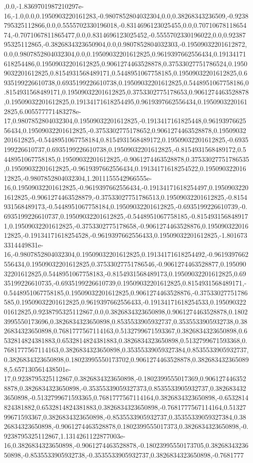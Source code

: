 ,0.0,-1.8369701987210297e-16,-1.0,0.0,0.1950903220161283,-0.9807852804032304,0.0,0.38268343236509,-0.9238795325112866,0.0,0.5555702330196018,-0.8314696123025455,0.0,0.7071067811865474,-0.7071067811865477,0.0,0.8314696123025452,-0.5555702330196022,0.0,0.9238795325112865,-0.3826834323650904,0.0,0.9807852804032303,-0.19509032201612872,0.0,0.9807852804032304,0.0,0.19509032201612825,0.9619397662556434,0.19134171618254486,0.19509032201612825,0.9061274463528878,0.37533027751786524,0.19509032201612825,0.8154931568489171,0.5448951067758185,0.19509032201612825,0.6935199226610738,0.6935199226610738,0.19509032201612825,0.5448951067758186,0.8154931568489171,0.19509032201612825,0.3753302775178653,0.9061274463528878,0.19509032201612825,0.19134171618254495,0.9619397662556434,0.19509032201612825,6.005577771483278e-17,0.9807852804032304,0.19509032201612825,-0.1913417161825448,0.9619397662556434,0.19509032201612825,-0.3753302775178652,0.9061274463528878,0.19509032201612825,-0.5448951067758184,0.8154931568489172,0.19509032201612825,-0.6935199226610737,0.6935199226610738,0.19509032201612825,-0.8154931568489172,0.5448951067758185,0.19509032201612825,-0.9061274463528878,0.37533027751786535,0.19509032201612825,-0.9619397662556434,0.19134171618254522,0.19509032201612825,-0.9807852804032304,1.2011155542966555e-16,0.19509032201612825,-0.9619397662556434,-0.19134171618254497,0.19509032201612825,-0.9061274463528879,-0.37533027751786513,0.19509032201612825,-0.8154931568489173,-0.5448951067758184,0.19509032201612825,-0.6935199226610739,-0.6935199226610737,0.19509032201612825,-0.5448951067758185,-0.8154931568489171,0.19509032201612825,-0.3753302775178658,-0.9061274463528876,0.19509032201612825,-0.19134171618254528,-0.9619397662556433,0.19509032201612825,-1.8016733314449831e-16,-0.9807852804032304,0.19509032201612825,0.19134171618254492,-0.9619397662556434,0.19509032201612825,0.37533027751786546,-0.9061274463528877,0.19509032201612825,0.5448951067758183,-0.8154931568489173,0.19509032201612825,0.6935199226610735,-0.6935199226610739,0.19509032201612825,0.8154931568489171,-0.5448951067758185,0.19509032201612825,0.9061274463528876,-0.37533027751786585,0.19509032201612825,0.9619397662556433,-0.19134171618254533,0.19509032201612825,0.9238795325112867,0.0,0.3826834323650898,0.9061274463528878,0.18023995550173696,0.3826834323650898,0.8535533905932737,0.3535533905932738,0.3826834323650898,0.7681777567114163,0.5132799671593367,0.3826834323650898,0.6532814824381883,0.6532814824381883,0.3826834323650898,0.5132799671593368,0.7681777567114163,0.3826834323650898,0.35355339059327384,0.8535533905932737,0.3826834323650898,0.18023995550173702,0.9061274463528878,0.3826834323650898,5.657130561438501e-17,0.9238795325112867,0.3826834323650898,-0.1802399555017369,0.9061274463528878,0.3826834323650898,-0.35355339059327373,0.8535533905932737,0.3826834323650898,-0.5132799671593365,0.7681777567114164,0.3826834323650898,-0.6532814824381882,0.6532814824381883,0.3826834323650898,-0.7681777567114164,0.5132799671593367,0.3826834323650898,-0.8535533905932737,0.35355339059327384,0.3826834323650898,-0.9061274463528878,0.1802399555017373,0.3826834323650898,-0.9238795325112867,1.1314261122877003e-16,0.3826834323650898,-0.9061274463528878,-0.18023995550173705,0.3826834323650898,-0.8535533905932738,-0.3535533905932737,0.3826834323650898,-0.7681777